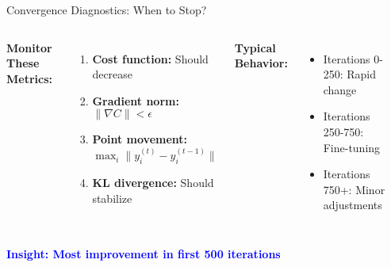 \documentclass[aspectratio=169]{beamer}
\newcommand{\conceptbox}[2]{\colorbox{#1!20}{\textcolor{#1}{\textbf{#2}}}}
\newcommand{\insight}[1]{\conceptbox{blue}{Insight: #1}}
\begin{document}
\begin{frame}{Convergence Diagnostics: When to Stop?}
\begin{columns}
\textbf{Monitor These Metrics:}
\begin{enumerate}
\item \textbf{Cost function:} Should decrease
\item \textbf{Gradient norm:} $\|\nabla C\| < \epsilon$
\item \textbf{Point movement:} $\max_i \|y_i^{(t)} - y_i^{(t-1)}\|$
\item \textbf{KL divergence:} Should stabilize
\end{enumerate}

\textbf{Typical Behavior:}
\begin{itemize}
\item Iterations 0-250: Rapid change
\item Iterations 250-750: Fine-tuning
\item Iterations 750+: Minor adjustments
\end{itemize}

\begin{center}
\end{center}
\end{columns}

\insight{Most improvement in first 500 iterations}
\end{frame}

\end{document}
